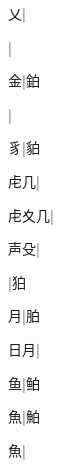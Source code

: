 \begin{multicols}{2}
{{乂}\mktsJzrVerticalBar{}{\cjk{}{\cnsym{}　}{\cnsym{}　}{\cnsym{}　}}|{}\par
{}\mktsJzrVerticalBar{}{\cjk{}{\cnsym{}　}{\cnsym{}　}{\cnsym{}　}}|{}\par
{\cjk{}{\cnsym{}　}{\cnsym{}　}金}\mktsJzrVerticalBar{}{\cjk{}{\cnsym{}　}{\cnsym{}　}{\cnsym{}　}}|{\cjk{}鉑}\par
{}\mktsJzrVerticalBar{}{\cjk{}{\cnsym{}　}{\cnsym{}　}{\cnsym{}　}}|{}\par
{\cjk{}{\cnsym{}　}{\cnsym{}　}豸}\mktsJzrVerticalBar{}{\cjk{}{\cnsym{}　}{\cnsym{}　}{\cnsym{}　}}|{\cjk{}貃}\par
{\cjk{}{\cnsym{}　}虍几}\mktsJzrVerticalBar{}{\cjk{}{\cnsym{}　}{\cnsym{}　}{\cnsym{}　}}|{}\par
{\cjk{}虍夊几}\mktsJzrVerticalBar{}{\cjk{}{\cnsym{}　}{\cnsym{}　}{\cnsym{}　}}|{}\par
{\cjk{}{\cnsym{}　}声殳}\mktsJzrVerticalBar{}{\cjk{}{\cnsym{}　}{\cnsym{}　}{\cnsym{}　}}|{}\par
{}\mktsJzrVerticalBar{}{\cjk{}{\cnsym{}　}{\cnsym{}　}{\cnsym{}　}}|{\cjk{}狛}\par
{\cjk{}{\cnsym{}　}{\cnsym{}　}月}\mktsJzrVerticalBar{}{\cjk{}{\cnsym{}　}{\cnsym{}　}{\cnsym{}　}}|{\cjk{}胉}\par
{\cjk{}{\cnsym{}　}日月}\mktsJzrVerticalBar{}{\cjk{}{\cnsym{}　}{\cnsym{}　}{\cnsym{}　}}|{}\par
{\cjk{}{\cnsym{}　}{\cnsym{}　}鱼}\mktsJzrVerticalBar{}{\cjk{}{\cnsym{}　}{\cnsym{}　}{\cnsym{}　}}|{\cjk{}鲌}\par
{\cjk{}{\cnsym{}　}{\cnsym{}　}魚}\mktsJzrVerticalBar{}{\cjk{}{\cnsym{}　}{\cnsym{}　}{\cnsym{}　}}|{\cjk{}鮊}\par
{\cjk{}{\cnsym{}　}{\cnsym{}　}魚}\mktsJzrVerticalBar{}{\cjk{}{\cnsym{}　}{\cnsym{}　}{\cnsym{}　}}|{}\par
}
\end{multicols}
